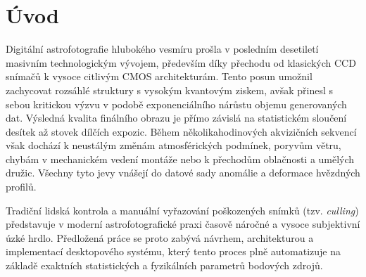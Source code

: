 \chapter{Úvod}
\label{ch:introduction}

Digitální astrofotografie hlubokého vesmíru prošla v posledním desetiletí masivním technologickým vývojem, především díky přechodu od klasických \ac{CCD} snímačů k vysoce citlivým \ac{CMOS} architekturám. Tento posun umožnil zachycovat rozsáhlé struktury s vysokým kvantovým ziskem, avšak přinesl s sebou kritickou výzvu v podobě exponenciálního nárůstu objemu generovaných dat. Výsledná kvalita finálního obrazu je přímo závislá na statistickém sloučení desítek až stovek dílčích expozic. Během několikahodinových akvizičních sekvencí však dochází k neustálým změnám atmosférických podmínek, poryvům větru, chybám v mechanickém vedení montáže nebo k přechodům oblačnosti a umělých družic. Všechny tyto jevy vnášejí do datové sady anomálie a deformace hvězdných profilů.

Tradiční lidská kontrola a manuální vyřazování poškozených snímků (tzv. \textit{culling}) představuje v moderní astrofotografické praxi časově náročné a vysoce subjektivní úzké hrdlo. Předložená práce se proto zabývá návrhem, architekturou a implementací desktopového systému, který tento proces plně automatizuje na základě exaktních statistických a fyzikálních parametrů bodových zdrojů.

